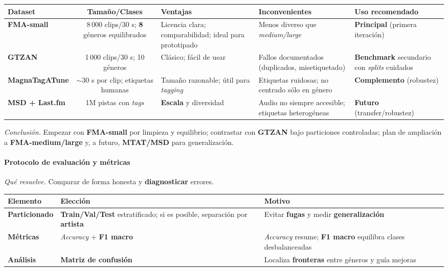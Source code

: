 \documentclass[12pt,twoside]{article}
\begin{document}
\begin{table}[h!]
  \centering
  \setlength{\tabcolsep}{4pt}
  \renewcommand{\arraystretch}{1.2}
  \footnotesize
  \begin{tabularx}{\textwidth}{l C Y Y Y}
    \toprule
    \textbf{Dataset} & \textbf{Tamaño/Clases} & \textbf{Ventajas} & \textbf{Inconvenientes} & \textbf{Uso recomendado} \\
    \midrule
    \textbf{FMA-small} & 8\,000 clips/30 s; \textbf{8} géneros equilibrados & Licencia clara; comparabilidad; ideal para prototipado & Menos diverso que \textit{medium/large} & \textbf{Principal} (primera iteración) \\
    \textbf{GTZAN} & 1\,000 clips/30 s; 10 géneros & Clásico; fácil de usar & Fallos documentados (duplicados, misetiquetado) & \textbf{Benchmark} secundario con \textit{splits} cuidados \\
    \textbf{MagnaTagATune} & $\sim$30 s por clip; etiquetas humanas & Tamaño razonable; útil para \textit{tagging} & Etiquetas ruidosas; no centrado sólo en género & \textbf{Complemento} (robustez) \\
    \textbf{MSD + Last.fm} & 1M pistas con \textit{tags} & \textbf{Escala} y diversidad & Audio no siempre accesible; etiquetas heterogéneas & \textbf{Futuro} (transfer/robustez) \\
    \bottomrule
  \end{tabularx}
\end{table}

\textit{Conclusión.} Empezar con \textbf{FMA-small} por limpieza y equilibrio; contrastar con \textbf{GTZAN} bajo particiones controladas; plan de ampliación a \textbf{FMA-medium/large} y, a futuro, \textbf{MTAT/MSD} para generalización.

\paragraph*{Protocolo de evaluación y métricas}

\textit{Qué resuelve.} Comparar de forma honesta y \textbf{diagnosticar} errores.

\begin{table}[h!]
  \centering
  \setlength{\tabcolsep}{4pt}
  \renewcommand{\arraystretch}{1.2}
  \footnotesize
  \begin{tabularx}{\textwidth}{l Y Y}
    \toprule
    \textbf{Elemento} & \textbf{Elección} & \textbf{Motivo} \\
    \midrule
    \textbf{Particionado} & \textbf{Train/Val/Test} estratificado; si es posible, separación por \textbf{artista} & Evitar \textbf{fugas} y medir \textbf{generalización} \\
    \textbf{Métricas} & \textit{Accuracy} + \textbf{F1 macro} & \textit{Accuracy} resume; \textbf{F1 macro} equilibra clases desbalanceadas \\
    \textbf{Análisis} & \textbf{Matriz de confusión} & Localiza \textbf{fronteras} entre géneros y guía mejoras \\
    \bottomrule
  \end{tabularx}
\end{table}
\end{document}
